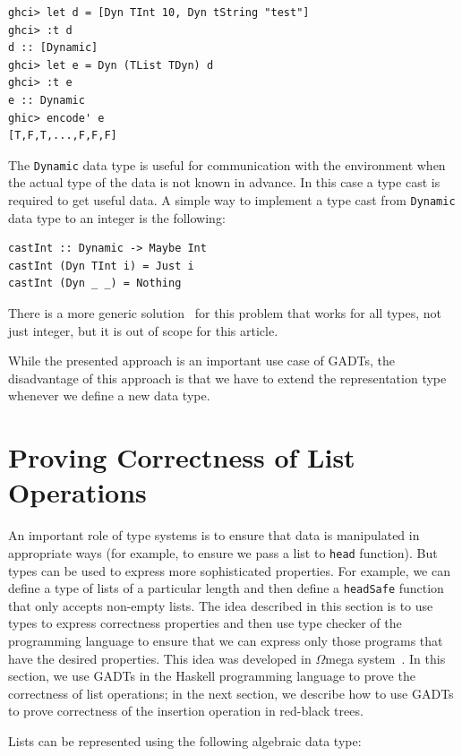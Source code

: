\documentclass{tmr}
\begin{document}
\begin{Verbatim}
ghci> let d = [Dyn TInt 10, Dyn tString "test"]
ghci> :t d
d :: [Dynamic]
ghci> let e = Dyn (TList TDyn) d
ghci> :t e
e :: Dynamic
ghic> encode' e
[T,F,T,...,F,F,F]
\end{Verbatim}

The \verb|Dynamic| data type is useful for communication with the environment when the actual type of the data is not known in advance. In this case a type cast is required to get useful data. A simple way to implement a type cast from \verb|Dynamic| data type to an integer is the following:

\begin{Verbatim}
castInt :: Dynamic -> Maybe Int
castInt (Dyn TInt i) = Just i
castInt (Dyn _ _) = Nothing
\end{Verbatim}

There is a more generic solution~\cite{fun_with_phantom_types} for this problem that works for all types, not just integer, but it is out of scope for this article.

While the presented approach is an important use case of GADTs, the disadvantage of this approach is that we have to extend the representation type whenever we define a new data type.

\section{Proving Correctness of List Operations}
\label{sec:list_operations}

An important role of type systems is to ensure that data is manipulated in appropriate ways (for example, to ensure we pass a list to \verb|head| function). But types can be used to express more sophisticated properties. For example, we can define a type of lists of a particular length and then define a \verb|headSafe| function that only accepts non-empty lists. The idea described in this section is to use types to express correctness properties and then use type checker of the programming language to ensure that we can express only those programs that have the desired properties. This idea was developed in $\Omega$mega system~\cite{curry_howard,omega}. In this section, we use GADTs in the Haskell programming language to prove the correctness of list operations; in the next section, we describe how to use GADTs to prove correctness of the insertion operation in red-black trees.

Lists can be represented using the following algebraic data type:
\end{document}
